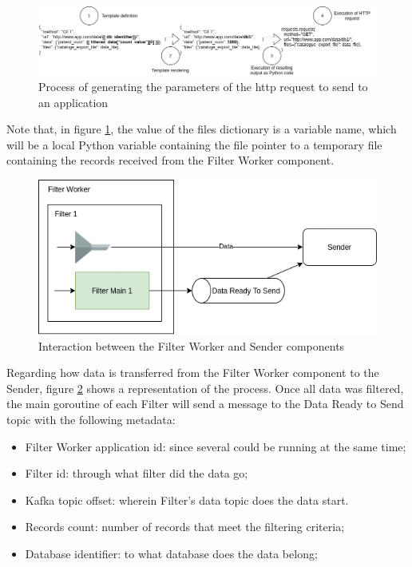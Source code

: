\begin{figure}[H]
    \center
    \includegraphics[width=\textwidth]{sender-request}
    \caption{Process of generating the parameters of the \gls{http} request to send to an application}
    \label{fig:sender-request}
\end{figure}

Note that, in figure \ref{fig:sender-request}, the value of the files dictionary is a variable name, which will be a local Python variable containing the file pointer to a temporary file containing the records received from the Filter Worker component.

\begin{figure}[H]
    \center
    \includegraphics[width=.5\textwidth]{sender-interaction}
    \caption{Interaction between the Filter Worker and Sender components}
    \label{fig:sender-interaction}
\end{figure}

Regarding how data is transferred from the Filter Worker component to the Sender, figure \ref{fig:sender-interaction} shows a representation of the process.
Once all data was filtered, the main goroutine of each Filter will send a message to the Data Ready to Send topic with the following metadata:
\begin{itemize}
    \item Filter Worker application id: since several could be running at the same time;
    \item Filter id: through what filter did the data go;
    \item Kafka topic offset: wherein Filter's data topic does the data start.
    \item Records count: number of records that meet the filtering criteria;
    \item Database identifier: to what database does the data belong;
\end{itemize}

